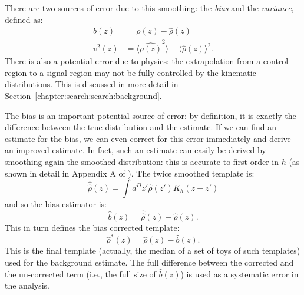 
There are two sources of error due to this smoothing: the \textit{bias} and the \textit{variance}, defined as:
%
\begin{align}
b(z) &= \rho(z) - \hat{\rho}(z)\nonumber\\
v^2(z) &= \langle \hat{\rho(z)}^2 \rangle  - \langle \hat{\rho}(z) \rangle^2.
\end{align}
%
There is also a potential error due to  physics: the extrapolation from a control region to a signal region may not be fully controlled by the kinematic distributions. This is discussed in more detail in Section~\ref{chapter:search:search:background}. 

The bias is an important potential source of error: by definition, it is exactly the difference between the true distribution and the estimate. If we can find an estimate for the bias, we can even correct for this error immediately and derive an improved estimate. In fact, such an estimate can easily be derived by smoothing again the smoothed distribution: this is accurate to first order in $h$ (as shown in detail in Appendix A of \cite{MassTemplates}). The twice smoothed template is:
%
\begin{equation}
\hat{\hat{\rho}}(z) = \int d^D z' \hat{\rho}(z') K_h (z-z')
\end{equation}
% 
and so the bias estimator is:
%
\begin{equation}
\hat{b}(z) = \hat{\hat{\rho}}(z) - \hat{\rho}(z).
\end{equation}
%
This in turn defines the bias corrected template:
%
\begin{equation}
\hat{\rho}^*(z) = \hat{\rho}(z) - \hat{b}(z).
\end{equation}
%
This is the final template (actually, the median of a set of toys of such templates) used for the background estimate. The full difference between the corrected and the un-corrected term (i.e., the full size of $\hat{b}(z)$) is used as a systematic error in the analysis.

